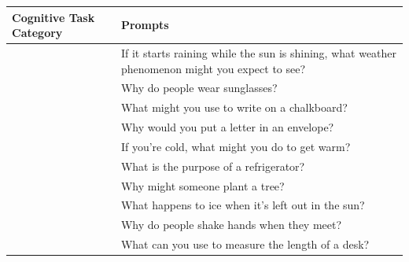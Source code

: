 \documentclass[11pt,a4paper]{ouparticle}
\begin{document}
\begin{table}[ht]
    \centering
    \begin{tabular}{>{\centering\arraybackslash}p{2.5cm} >{\centering\arraybackslash}p{13cm}}
        \toprule
        \textbf{Cognitive Task Category} & \textbf{Prompts} \\
        \midrule

        \addlinespace
        \multirow{10}{=}{\textbf{Basic Common Sense Reasoning}} & If it starts raining while the sun is shining, what weather phenomenon might you expect to see? \\
                                     & Why do people wear sunglasses? \\
                                     & What might you use to write on a chalkboard? \\
                                     & Why would you put a letter in an envelope? \\
                                     & If you're cold, what might you do to get warm? \\
                                     & What is the purpose of a refrigerator? \\
                                     & Why might someone plant a tree? \\
                                     & What happens to ice when it's left out in the sun? \\
                                     & Why do people shake hands when they meet? \\
                                     & What can you use to measure the length of a desk? \\


\end{tabular}
\end{table}
\end{document}
